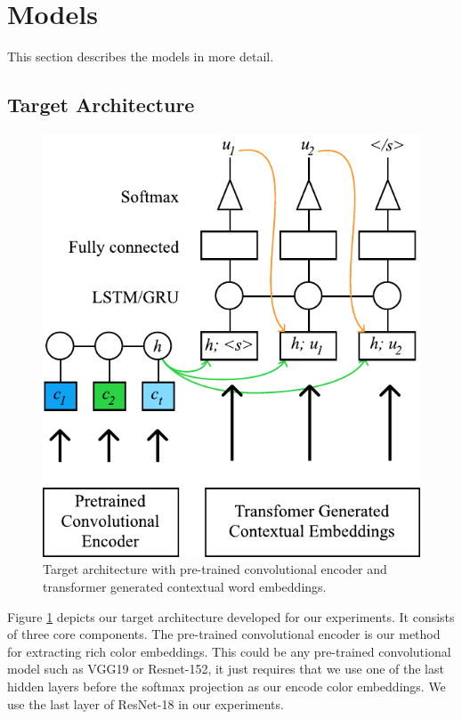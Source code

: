 \section{Models}

This section describes the models in more detail.

\subsection{Target Architecture}

\begin{figure}[ht]
\centering
\includegraphics[width=\columnwidth]{assets/target_architecture.pdf}
\caption[Target Architecture]
{Target architecture with pre-trained convolutional encoder and transformer generated contextual word embeddings.}
\label{overview}
\end{figure}

Figure \ref{overview} depicts our target architecture developed for our experiments. It consists of three core components. The pre-trained convolutional encoder is our method for extracting rich color embeddings. This could be any pre-trained convolutional model such as VGG19 or Resnet-152, it just requires that we use one of the last hidden layers before the softmax projection as our encode color embeddings. We use the last layer of ResNet-18 in our experiments.

